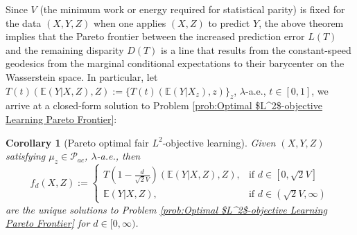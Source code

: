 \documentclass[twoside,11pt]{article}
\newtheorem{coro}{Corollary}[section]{\bfseries}{\itshape}
\begin{document}
Since $V$ (the minimum work or energy required for statistical parity) is fixed for the data $(X,Y,Z)$ when one applies $(X,Z)$ to predict $Y$, the above theorem implies that the Pareto frontier between the increased prediction error $L(T)$ and the remaining disparity $D(T)$ is a line that results from the constant-speed geodesics from the marginal conditional expectations to their barycenter on the Wasserstein space. In particular, let $T(t)(\mathbb{E}(Y|X,Z),Z) := \{T(t)(\mathbb{E}(Y|X_z),z)\}_z$, $\lambda$-a.e., $t \in [0,1]$, we arrive at a closed-form solution to Problem \ref{prob:Optimal $L^2$-objective Learning Pareto Frontier}:

\begin{coro}[Pareto optimal fair $L^2$-objective learning]\label{corr:Pareto Optimal Fair L2-objective Learning}
Given $(X,Y,Z)$ satisfying $\mu_z \in \mathcal{P}_{ac}$, $\lambda$-a.e., then \begin{equation}
 f_d(X,Z) := 
\begin{cases}
    T(1- \frac{d}{\sqrt{2}V})(\mathbb{E}(Y|X,Z),Z), & \text{if } d \in [0,\sqrt{2}V]\\
    \mathbb{E}(Y|X,Z), & \text{if } d \in (\sqrt{2}V, \infty)
\end{cases}
\end{equation}
are the unique solutions to Problem \ref{prob:Optimal $L^2$-objective Learning Pareto Frontier} for $d \in [0,\infty)$.
\end{coro}
\end{document}
